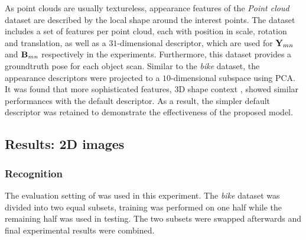 As point clouds are usually textureless, appearance features of the \emph{Point cloud} dataset are described by the local shape around the interest points. 
The dataset includes a set of features per point cloud, each with position in scale, rotation and translation, as well as a $31$-dimensional descriptor, which are used for $\mathbf{Y}_{mn}$ and $\mathbf{B}_{mn}$ respectively in the experiments. Furthermore, this dataset provides a groundtruth pose for each object scan.
Similar to the \emph{bike} dataset, the appearance descriptors were projected to a $10$-dimensional subspace using PCA.   
It was found that more sophisticated features, \eg 3D shape context \cite{Frome2004}, showed similar performances with the default descriptor. As a result, the simpler default descriptor was retained to demonstrate the effectiveness of the proposed model.


\subsection{Results: 2D images}

\subsubsection{Recognition}

The evaluation setting of \cite{Fergus2007} was used in this experiment. The \emph{bike} dataset was divided into two equal subsets, training was performed on one half while the remaining half was used in testing. The two subsets were swapped afterwards and final experimental results were combined.

